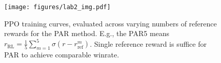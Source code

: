 \begin{figure}[htbp]
\centering
\texttt{[image: figures/lab2\_img.pdf]}

\caption{PPO training curves, evaluated across varying numbers of reference rewards for the PAR method. E.g., the PAR5 means $r_{\text{RL}}=\frac{1}{5}\sum_{m=1}^5\sigma(r-r_{\text{ref}}^m)$. Single reference reward is suffice for PAR to achieve comparable winrate.}
\label{fig:lab2}
\end{figure}